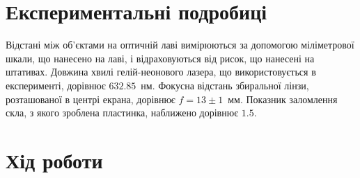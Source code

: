 \section{Експериментальні подробиці}

Відстані між об’єктами на оптичній лаві вимірюються за допомогою міліметрової
шкали, що нанесено на лаві, і відраховуються від рисок, що нанесені на штативах.  Довжина хвилі гелій-неонового лазера, що використовується в експерименті, дорівнює $632.85$~нм. Фокусна відстань збиральної лінзи, розташованої в центрі екрана, дорівнює $f = 13 \pm 1$~мм. Показник заломлення скла, з якого зроблена пластинка, наближено дорівнює $1.5$.

\section{Хід роботи}
